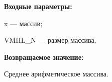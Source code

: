 \textbf{Входные параметры:}

 x --- массив;
 
 VMHL\_N --- размер массива.

\textbf{Возвращаемое значение:}

 Среднее арифметическое массива.
